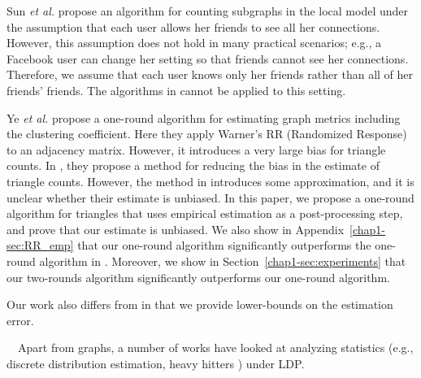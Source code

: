 Sun \textit{et al.} \cite{Sun_CCS19} propose an algorithm for counting subgraphs in the local model under the assumption that each user allows her friends to see all her connections. 
However, this assumption does not hold in many practical scenarios; e.g., a Facebook user can change her setting so that friends cannot see her connections. Therefore, we assume that each user knows only her friends rather than all of her friends' friends. 
The algorithms in \cite{Sun_CCS19} cannot be applied to this setting.

Ye \textit{et al.} \cite{Ye_ICDE20} propose a one-round algorithm for estimating graph metrics including the clustering coefficient. 
Here they apply Warner's RR (Randomized Response) to an adjacency matrix. 
However, it introduces a very large bias for triangle counts.
In \cite{Ye_TKDE21}, they propose a method for reducing the bias in the estimate of triangle counts. 
However, the method in \cite{Ye_TKDE21} introduces some approximation, and it is unclear whether their estimate is unbiased. 
In this paper, we propose a one-round algorithm for triangles that uses empirical estimation as a post-processing step, and prove that our estimate is unbiased. 
We also show in Appendix~\ref{chap1-sec:RR_emp} that our one-round algorithm significantly outperforms the one-round algorithm in \cite{Ye_ICDE20}. 
Moreover, we show in Section~\ref{chap1-sec:experiments} that our two-rounds algorithm significantly outperforms our one-round algorithm.

Our work also differs from \cite{Sun_CCS19,Ye_ICDE20,Ye_TKDE21} in that we provide lower-bounds on the estimation error.


\smallskip
{}~~Apart from graphs, a number of works have looked at analyzing statistics (e.g., discrete distribution estimation\cite{Acharya_AISTATS19,Fanti_PoPETs16,Kairouz_ICML16,Kairouz_JMLR16,Murakami_USENIX19,Wang_USENIX17,Ye_ISIT17}, 
heavy hitters \cite{Bassily_STOC15,Bassily_NIPS17,Qin_CCS16}) under LDP. 

